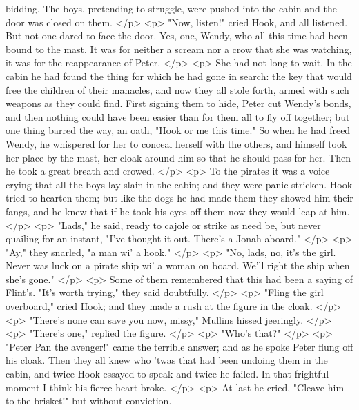       bidding. The boys, pretending to struggle, were pushed into the cabin and
      the door was closed on them.
    </p>
    <p>
      "Now, listen!" cried Hook, and all listened. But not one dared to face the
      door. Yes, one, Wendy, who all this time had been bound to the mast. It
      was for neither a scream nor a crow that she was watching, it was for the
      reappearance of Peter.
    </p>
    <p>
      She had not long to wait. In the cabin he had found the thing for which he
      had gone in search: the key that would free the children of their
      manacles, and now they all stole forth, armed with such weapons as they
      could find. First signing them to hide, Peter cut Wendy's bonds, and then
      nothing could have been easier than for them all to fly off together; but
      one thing barred the way, an oath, "Hook or me this time." So when he had
      freed Wendy, he whispered for her to conceal herself with the others, and
      himself took her place by the mast, her cloak around him so that he should
      pass for her. Then he took a great breath and crowed.
    </p>
    <p>
      To the pirates it was a voice crying that all the boys lay slain in the
      cabin; and they were panic-stricken. Hook tried to hearten them; but like
      the dogs he had made them they showed him their fangs, and he knew that if
      he took his eyes off them now they would leap at him.
    </p>
    <p>
      "Lads," he said, ready to cajole or strike as need be, but never quailing
      for an instant, "I've thought it out. There's a Jonah aboard."
    </p>
    <p>
      "Ay," they snarled, "a man wi' a hook."
    </p>
    <p>
      "No, lads, no, it's the girl. Never was luck on a pirate ship wi' a woman
      on board. We'll right the ship when she's gone."
    </p>
    <p>
      Some of them remembered that this had been a saying of Flint's. "It's
      worth trying," they said doubtfully.
    </p>
    <p>
      "Fling the girl overboard," cried Hook; and they made a rush at the figure
      in the cloak.
    </p>
    <p>
      "There's none can save you now, missy," Mullins hissed jeeringly.
    </p>
    <p>
      "There's one," replied the figure.
    </p>
    <p>
      "Who's that?"
    </p>
    <p>
      "Peter Pan the avenger!" came the terrible answer; and as he spoke Peter
      flung off his cloak. Then they all knew who 'twas that had been undoing
      them in the cabin, and twice Hook essayed to speak and twice he failed. In
      that frightful moment I think his fierce heart broke.
    </p>
    <p>
      At last he cried, "Cleave him to the brisket!" but without conviction.
